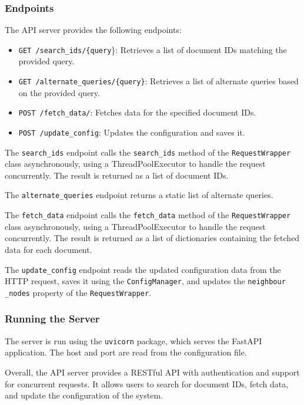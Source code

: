 \documentclass{article}
\begin{document}
\subsubsection{Endpoints}
\label{sec:endpoints}

The API server provides the following endpoints:

\begin{itemize}
    \item \texttt{GET /search\_ids/\{query}\}: Retrieves a list of document IDs matching the 
    provided query.
    \item \texttt{GET /alternate\_queries/\{query\}}: Retrieves a list of alternate queries 
    based on the provided query.
    \item \texttt{POST /fetch\_data/}: Fetches data for the specified document IDs.
    \item \texttt{POST /update\_config}: Updates the configuration and saves it.
\end{itemize}

The \texttt{search\_ids} endpoint calls the \texttt{search\_ids} method of the 
\texttt{RequestWrapper} class asynchronously, using a ThreadPoolExecutor to handle the request 
concurrently. The result is returned as a list of document IDs.

The \texttt{alternate\_queries} endpoint returns a static list of alternate queries.

The \texttt{fetch\_data} endpoint calls the \texttt{fetch\_data} method of the 
\texttt{RequestWrapper} class asynchronously, using a ThreadPoolExecutor to handle the request 
concurrently. The result is returned as a list of dictionaries containing the fetched data for 
each document.

The \texttt{update\_config} endpoint reads the updated configuration data from the HTTP request, 
saves it using the \texttt{ConfigManager}, and updates the \texttt{neighbour\\\_nodes} property of 
the \texttt{RequestWrapper}.

\subsubsection{Running the Server}

The server is run using the \texttt{uvicorn} package, which serves the FastAPI application. The 
host and port are read from the configuration file.

Overall, the API server provides a RESTful API with authentication and support for concurrent 
requests. It allows users to search for document IDs, fetch data, and update the configuration 
of the system.
\end{document}

